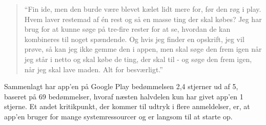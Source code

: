 \begin{quote}
``Fin ide, men den burde være blevet kælet lidt mere for, før den røg i play. Hvem laver restemad af én rest og så en masse ting der skal købes? Jeg har brug for at kunne søge på tre-fire rester for at se, hvordan de kan kombineres til noget spændende. Og hvis jeg finder en opskrift, jeg vil prøve, så kan jeg ikke gemme den i appen, men skal søge den frem igen når jeg står i netto og skal købe de ting, der skal til - og søge den frem igen, når jeg skal lave maden. Alt for besværligt.''
\end{quote}

Sammenlagt har app’en på Google Play bedømmelsen 2,4 stjerner ud af 5, baseret på 69 bedømmelser, hvoraf næsten halvdelen kun har givet app’en 1 stjerne. Et andet kritikpunkt, der kommer til udtryk i flere anmeldelser, er, at app’en bruger for mange systemressourcer og er langsom til at starte op.
